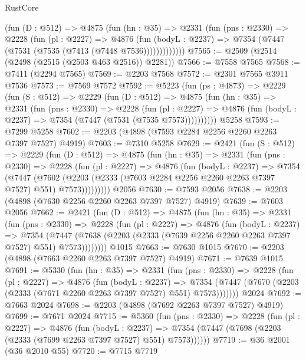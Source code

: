 \begin{lexlean}{RustCore}
\begin{coremodule}
          (fun (D : @512) =>
          @4875
            (fun (hn : @35) =>
            @2331
              (fun (pns : @2330) =>
              @2228
                (fun (pl : @2227) =>
                @4876
                  (fun (bodyL : @2237) =>
                  @7354 (@7447 (@7531 (@7535 (@7413 (@7448 @7536)))))))))))))
@7565 := @2509 (@2514 (@2498 (@2515 (@2503 @463 @2516)) @2281))
@7566 := @7558 @7565
@7568 := @7411 (@2294 @7565)
@7569 := @2203 @7568
@7572 := @2301 @7565 @3911 @7536
@7573 := @7569 @7572
@7592 := @5223
    (fun (ps : @4873) =>
    @2229
      (fun (S : @512) =>
      @2229
        (fun (D : @512) =>
        @4875
          (fun (hn : @35) =>
          @2331
            (fun (pns : @2330) =>
            @2228
              (fun (pl : @2227) =>
              @4876 (fun (bodyL : @2237) => @7354 (@7447 (@7531 (@7535 @7573))))))))))
    @5258
@7593 := @7299 @5258
@7602 := @2203 (@4898 (@7593 @2284 @2256 @2260 @2263 @7397 @7527) @4919)
@7603 := @7310 @5258
@7629 := @2421
    (fun (S : @512) =>
    @2229
      (fun (D : @512) =>
      @4875
        (fun (hn : @35) =>
        @2331
          (fun (pns : @2330) =>
          @2228
            (fun (pl : @2227) =>
            @4876
              (fun (bodyL : @2237) =>
              @7354
                (@7447
                  (@7602
                    (@2203 (@2333 (@7603 @2284 @2256 @2260 @2263 @7397 @7527) @551) @7573)))))))))
    @2056
@7630 := @7593 @2056
@7638 := @2203 (@4898 (@7630 @2256 @2260 @2263 @7397 @7527) @4919)
@7639 := @7603 @2056
@7662 := @2421
    (fun (D : @512) =>
    @4875
      (fun (hn : @35) =>
      @2331
        (fun (pns : @2330) =>
        @2228
          (fun (pl : @2227) =>
          @4876
            (fun (bodyL : @2237) =>
            @7354
              (@7447 (@7638 (@2203 (@2333 (@7639 @2256 @2260 @2263 @7397 @7527) @551) @7573))))))))
    @1015
@7663 := @7630 @1015
@7670 := @2203 (@4898 (@7663 @2260 @2263 @7397 @7527) @4919)
@7671 := @7639 @1015
@7691 := @5330
    (fun (hn : @35) =>
    @2331
      (fun (pns : @2330) =>
      @2228
        (fun (pl : @2227) =>
        @4876
          (fun (bodyL : @2237) =>
          @7354 (@7447 (@7670 (@2203 (@2333 (@7671 @2260 @2263 @7397 @7527) @551) @7573)))))))
    @2024
@7692 := @7663 @2024
@7698 := @2203 (@4898 (@7692 @2263 @7397 @7527) @4919)
@7699 := @7671 @2024
@7715 := @5360
    (fun (pns : @2330) =>
    @2228
      (fun (pl : @2227) =>
      @4876
        (fun (bodyL : @2237) =>
        @7354 (@7447 (@7698 (@2203 (@2333 (@7699 @2263 @7397 @7527) @551) @7573))))))
@7719 := @36 @2001 (@36 @2010 @55)
@7720 := @7715 @7719

\end{coremodule}
\end{lexlean}
